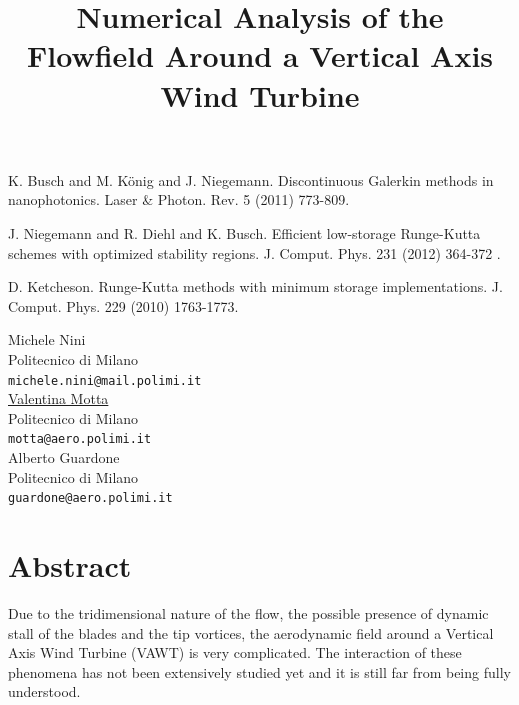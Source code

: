 \documentclass[article, A4, 11pt]{llncs}%
\begin{document}

\begin{thebibliography}{10}
{\sc  K. Busch and M. K\"onig and J. Niegemann}. {Discontinuous Galerkin methods in nanophotonics}. Laser \& Photon. Rev. 5 (2011) 773-809.

{\sc J. Niegemann and R. Diehl and K. Busch}. {Efficient low-storage Runge-Kutta schemes with optimized stability regions}. J. Comput. Phys. 231 (2012) 364-372 .

{\sc D. Ketcheson}. {Runge-Kutta methods with minimum storage implementations}. J. Comput. Phys. 229 (2010) 1763-1773.
\end{thebibliography} %

\title{Numerical Analysis of the Flowfield Around a Vertical Axis Wind Turbine}
 \author{} \institute{}
\maketitle
\begin{center}
{\large Michele Nini}\\
Politecnico di Milano\\
{\tt michele.nini@mail.polimi.it}
\\ \vspace{4mm}
{\large \underline{Valentina Motta}}\\
Politecnico di Milano\\
{\tt motta@aero.polimi.it}
\\ \vspace{4mm}
{\large Alberto Guardone}\\
Politecnico di Milano\\
{\tt guardone@aero.polimi.it}
\end{center}

\section*{Abstract}
Due to  the tridimensional nature of the flow, the possible presence of dynamic stall of the blades and the tip vortices, the aerodynamic field around a Vertical Axis Wind Turbine (VAWT) is very complicated. The interaction of these phenomena has not been extensively studied yet and it is still far from being fully understood.
\end{document}

